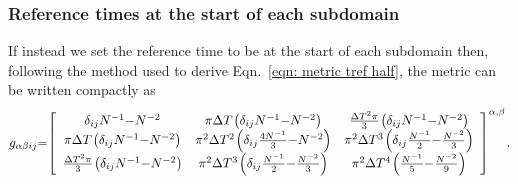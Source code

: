 \documentclass[../full_thesis/full_thesis.tex]{subfiles}
\begin{document}
\subsubsection{Reference times at the start of each subdomain}
If instead we set the reference time to be at the start of each subdomain then,
following the method used to derive Eqn.~\eqref{eqn: metric tref half}, the
metric can be written compactly as
\begin{equation}
\medmuskip=0mu
\thinmuskip=1.5mu
\thickmuskip=0mu
g_{\alpha\beta ij}  =  \left[\begin{array}{ccc}
\delta_{ij}N^{-1}  -N^{-2}  &
\pi\dT \left( \delta_{ij}N^{-1} - N^{-2}\right)&
\frac{\dT^{2}\pi}{3} \left( \delta_{ij}N^{-1} - N^{-2}\right)\\
\pi\dT \left( \delta_{ij}N^{-1} - N^{-2}\right)&
\pi^{2}\dT^{2}\left(\delta_{ij}\frac{4N^{-1}}{3} - N^{-2}\right) &
\pi^{2}\dT^{3}\left(\delta_{ij}\frac{N^{-1}}{2} - \frac{N^{-2}}{3}\right) \\
\frac{\dT^{2}\pi}{3} \left( \delta_{ij}N^{-1} - N^{-2}\right) &
\pi^{2}\dT^{3}\left(\delta_{ij}\frac{N^{-1}}{2} - \frac{N^{-2}}{3}\right)  &
\pi^{2}\dT^{4}\left(\frac{N^{-1}}{5} - \frac{N^{-2}}{9}\right) \\
\end{array}
\right]^{\alpha, \beta}.
\label{eqn: metric equal subdomains tref 0}
\end{equation}



\biblio
\end{document}
